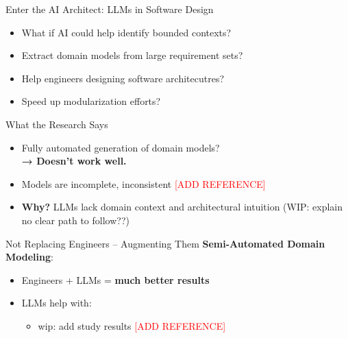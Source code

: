 \documentclass[aspectratio=169,12pt]{beamer}
\begin{document}
\begin{frame}{Enter the AI Architect: LLMs in Software Design}
\begin{itemize}
    \item What if AI could help identify bounded contexts?
    \item Extract domain models from large requirement sets?
    \item Help engineers designing software architecutres?
    \item Speed up modularization efforts?
\end{itemize}
\end{frame}

\begin{frame}{What the Research Says}
    \begin{itemize}
        \item Fully automated generation of domain models? \\
        \textbf{→ Doesn't work well.}
        
        \item Models are incomplete, inconsistent \textcolor{red}{[ADD REFERENCE]}
        
        \item \textbf{Why?} LLMs lack domain context and architectural intuition (WIP:  explain no clear path to follow??)
    \end{itemize}
\end{frame}

\begin{frame}{Not Replacing Engineers – Augmenting Them}
\textbf{Semi-Automated Domain Modeling}:
\begin{itemize}
    \item Engineers + LLMs = \textbf{much better results}
    \item LLMs help with:
    \begin{itemize}
        \item wip: add study results \textcolor{red}{[ADD REFERENCE]}
    \end{itemize}
\end{itemize}
\end{frame}
\end{document}
